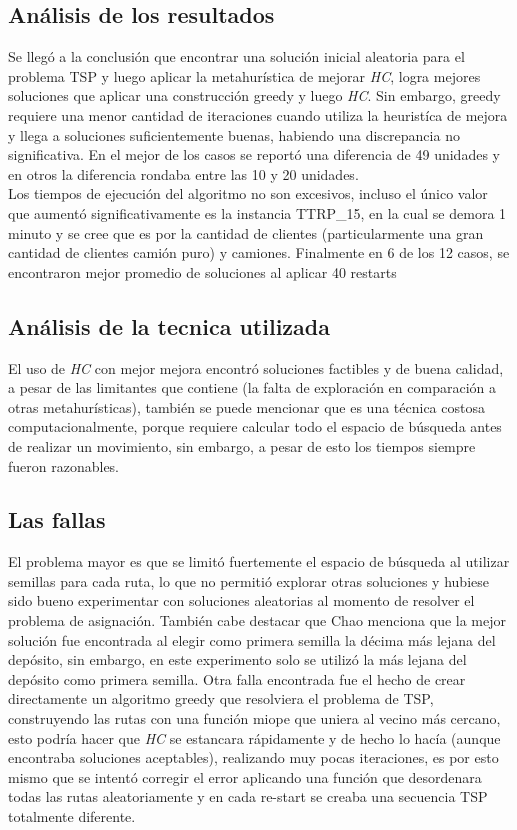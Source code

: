 \documentclass[letter, 10pt]{article}
\begin{document}
\subsection{Análisis de los resultados}
Se llegó a la conclusión que encontrar una solución inicial aleatoria para el problema TSP y luego aplicar la metahurística de mejorar \textit{HC}, logra mejores soluciones que aplicar una construcción greedy y luego \textit{HC}. Sin embargo, greedy requiere una menor cantidad de iteraciones cuando utiliza la heuristíca de mejora y llega a soluciones suficientemente buenas, habiendo una discrepancia no significativa. En el mejor de los casos se reportó una diferencia de 49 unidades y en otros la diferencia rondaba entre las 10 y 20 unidades. \\Los tiempos de ejecución del algoritmo no son excesivos, incluso el único valor que aumentó significativamente es la instancia TTRP\_15, en la cual se demora 1 minuto y se cree que es por la cantidad de clientes (particularmente una gran cantidad de clientes camión puro) y camiones. Finalmente en 6 de los 12 casos, se encontraron mejor promedio de soluciones al aplicar 40 restarts
\subsection{Análisis de la tecnica utilizada}
El uso de \textit{HC} con mejor mejora encontró soluciones factibles y de buena calidad, a pesar de las limitantes que contiene (la falta de exploración en comparación a otras metahurísticas), también se puede mencionar que es una técnica costosa computacionalmente, porque requiere calcular todo el espacio de búsqueda antes de realizar un movimiento, sin embargo, a pesar de esto los tiempos siempre fueron razonables.  
\subsection{Las fallas}
El problema mayor es que se limitó fuertemente el espacio de búsqueda al utilizar semillas para cada ruta, lo que no permitió explorar otras soluciones y hubiese sido bueno experimentar con soluciones aleatorias al momento de resolver el problema de asignación. También cabe destacar que Chao \cite{Chao} menciona que la mejor solución fue encontrada al elegir como primera semilla la décima más lejana del depósito, sin embargo, en este experimento solo se utilizó la más lejana del depósito como primera semilla. Otra falla encontrada fue el hecho de crear directamente un algoritmo greedy que resolviera el problema de TSP, construyendo las rutas con una función miope que uniera al vecino más cercano, esto podría hacer que \textit{HC} se estancara rápidamente y de hecho lo hacía (aunque encontraba soluciones aceptables), realizando muy pocas iteraciones, es por esto mismo que se intentó corregir el error aplicando una función que desordenara todas las rutas aleatoriamente y en cada re-start se creaba una secuencia TSP totalmente diferente.
\end{document}
